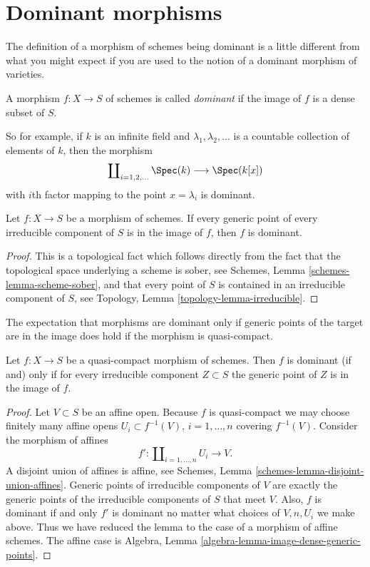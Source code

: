 \section{Dominant morphisms}
\label{section-dominant}

\noindent
The definition of a morphism of schemes being dominant is a little
different from what you might expect if you are used to the notion
of a dominant morphism of varieties.

\begin{definition}
\label{definition-dominant}
A morphism $f : X \to S$ of schemes is called {\it dominant} if the
image of $f$ is a dense subset of $S$.
\end{definition}

\noindent
So for example, if $k$ is an infinite field and $\lambda_1, \lambda_2, \ldots$
is a countable collection of elements of $k$, then the morphism
$$
\coprod\nolimits_{i = 1, 2, \ldots } \Spec(k)
\longrightarrow
\Spec(k[x])
$$
with $i$th factor mapping to the point $x = \lambda_i$ is dominant.

\begin{lemma}
\label{lemma-generic-points-in-image-dominant}
Let $f : X \to S$ be a morphism of schemes.
If every generic point of every irreducible component of $S$
is in the image of $f$, then $f$ is dominant.
\end{lemma}

\begin{proof}
This is a topological fact which follows directly from the fact that
the topological space underlying a scheme is sober, see
Schemes, Lemma \ref{schemes-lemma-scheme-sober}, and that
every point of $S$ is contained in an irreducible component of
$S$, see Topology, Lemma \ref{topology-lemma-irreducible}.
\end{proof}

\noindent
The expectation that morphisms are dominant only if generic points of the
target are in the image does hold if the morphism is quasi-compact.

\begin{lemma}
\label{lemma-quasi-compact-dominant}
Let $f : X \to S$ be a quasi-compact morphism of schemes.
Then $f$ is dominant (if and) only if for every irreducible
component $Z \subset S$ the generic point of $Z$ is in the
image of $f$.
\end{lemma}

\begin{proof}
Let $V \subset S$ be an affine open.
Because $f$ is quasi-compact we may choose finitely many affine
opens $U_i \subset f^{-1}(V)$, $i = 1, \ldots, n$ covering
$f^{-1}(V)$. Consider the morphism of affines
$$
f' :
\coprod\nolimits_{i = 1, \ldots, n} U_i
\longrightarrow
V.
$$
A disjoint union of affines is affine, see
Schemes, Lemma \ref{schemes-lemma-disjoint-union-affines}.
Generic points of irreducible components of $V$
are exactly the generic points of the irreducible components of
$S$ that meet $V$. Also, $f$ is dominant if and only $f'$ is dominant
no matter what choices of $V, n, U_i$ we make above. Thus we
have reduced the lemma to the case of a morphism of affine schemes.
The affine case is
Algebra, Lemma \ref{algebra-lemma-image-dense-generic-points}.
\end{proof}

